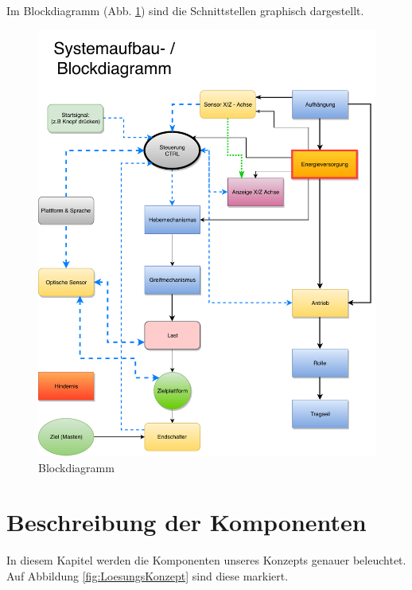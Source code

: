 \documentclass[a4paper]{report}
\begin{document}
\newpage
Im Blockdiagramm (Abb. \ref{fig:Blockdiagramm}) sind die Schnittstellen graphisch dargestellt.

\begin{figure}[h!]
	\centering
	\includegraphics[keepaspectratio,width=\textwidth]{Blockdiagramm}
	\caption{Blockdiagramm}
	\label{fig:Blockdiagramm}
\end{figure}

\newpage
\section{Beschreibung der Komponenten}
\label{sec:KompBeschrieb}
In diesem Kapitel werden die Komponenten unseres Konzepts genauer beleuchtet. Auf Abbildung \ref{fig:LoesungsKonzept} sind diese markiert.
\end{document}
